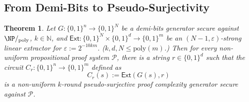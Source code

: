 \documentclass[10pt,a4paper]{article}
\newtheorem{theorem}{Theorem}[section]
\theoremstyle{definition}
\theoremstyle{remark}
\renewcommand{\poly}{\mathrm{poly}}
\newcommand{\eps}{\varepsilon}
\newcommand{\Ext}{\mathsf{Ext}}
\newcommand{\calP}{\mathcal{P}}
\newcommand{\N}{\mathbb{N}}
\begin{document}
\ThmPVvsAPC*



\subsection{From Demi-Bits to Pseudo-Surjectivity}\label{sec: pseudosurjectivity}

\begin{theorem}\label{thm:pseudo-pcg-fix}
    Let $G:\{0,1\}^n\to\{0,1\}^N$ be a demi-bits generator secure against $\NP/_{\poly}$, $k\in\N$, and $\Ext:\{0,1\}^N\times\{0,1\}^d\to\{0,1\}^m$ be an $(N-1,\eps)$-strong linear extractor for $\eps:=2^{-10km}$. ($k,d,N\leq\poly(m)$.) Then for every non-uniform propositional proof system $\calP$, there is a string $r\in\{0,1\}^d$ such that the circuit $C_r: \{0,1\}^n\to \{0,1\}^m$ defined as
    \[C_r(s) := \Ext(G(s), r)\]
    is a non-uniform $k$-round pseudo-surjective proof complexity generator secure against $\calP$.
\end{theorem}
\end{document}
